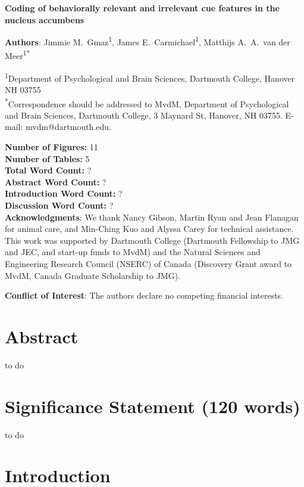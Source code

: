 \documentclass[11pt]{article}
\begin{document}
{\Large\bf Coding of behaviorally relevant and irrelevant cue features in the nucleus accumbens}

{\bf Authors}: Jimmie M.\ Gmaz\textsuperscript{1}, James
E.\ Carmichael\textsuperscript{1}, Matthijs A.\ A.\ van der
Meer\textsuperscript{1*}

\textsuperscript{1}Department of Psychological and Brain Sciences,
Dartmouth College, Hanover NH
03755\\ 

\textsuperscript{*}Correspondence should be addressed to MvdM,
Department of Psychological and Brain Sciences, Dartmouth College, 3
Maynard St, Hanover, NH 03755. E-mail: {\sffamily mvdm@dartmouth.edu}.

\textbf{Number of Figures:} 11\\
\textbf{Number of Tables:} 5\\
\textbf{Total Word Count:} ?\\
\textbf{Abstract Word Count:} ?\\
\textbf{Introduction Word Count:} ?\\
\textbf{Discussion Word Count:} ?\\

\textbf{Acknowledgments}: We thank Nancy Gibson, Martin Ryan and Jean
Flanagan for animal care, and Min-Ching Kuo and
Alyssa Carey for technical assistance. This work was supported by
Dartmouth College (Dartmouth Fellowship to JMG and JEC, and start-up funds to
MvdM) and the Natural Sciences and Engineering Research Council
(NSERC) of Canada (Discovery Grant award to MvdM, Canada Graduate
Scholarship to JMG).

\textbf{Conflict of Interest}: The authors declare no competing
financial interests.\\

\newpage
\linenumbers

\section*{Abstract}

to do

\section*{Significance Statement (120 words)}

to do

\newpage

\section*{Introduction}
\end{document}

